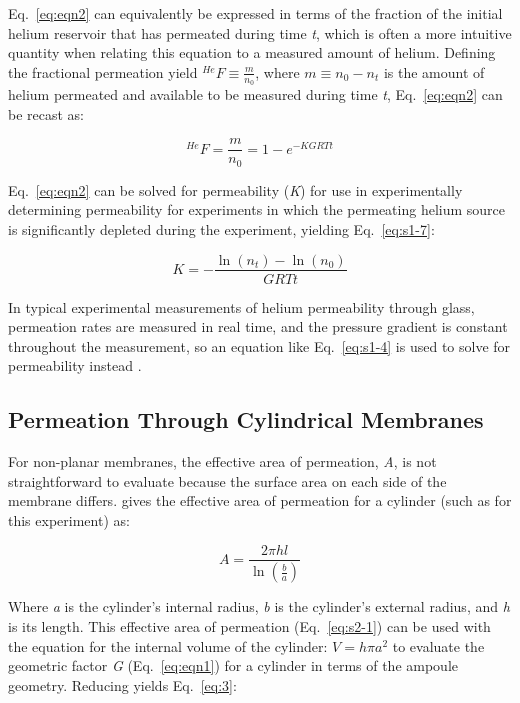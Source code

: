 Eq.~\eqref{eq:eqn2} can equivalently be expressed in terms of the
fraction of the initial helium reservoir that has permeated during time
\emph{t}, which is often a more intuitive quantity when relating this
equation to a measured amount of helium. Defining the fractional
permeation yield \(^{He}F \equiv \frac{m}{n_{0}}\), where
\(m \equiv n_{0} - n_{t}\) is the amount of helium permeated and available to be measured
during time \emph{t}, Eq.~\eqref{eq:eqn2} can be recast as:

\begin{equation}
^{He}F = \frac{m}{n_{0}} = 1 - e^{- KGRTt}
\label{eq:fracyield}
\end{equation}

Eq.~\eqref{eq:eqn2} can be solved for permeability (\emph{K}) for use in
experimentally determining permeability for experiments in which the
permeating helium source is significantly depleted during the
experiment, yielding Eq.~\eqref{eq:s1-7}:

\begin{equation}
K = - \frac{\ln\left( n_{t} \right) - \ln\left( n_{0} \right)}{GRTt}
\label{eq:s1-7}
\end{equation}

In typical experimental measurements of helium permeability through
glass, permeation rates are measured in real time, and the pressure
gradient is constant throughout the measurement, so an equation like
Eq.~\eqref{eq:s1-4} is used to solve for permeability instead \citep{norton1953,swets1961,altemose1961}.

\subsection{Permeation Through Cylindrical Membranes}\label{permeation-through-cylindrical-membranes}

For non-planar membranes, the effective area of permeation, \emph{A}, is
not straightforward to evaluate because the surface area on each side of
the membrane differs. \citet{masaryk1968} gives the effective area of
permeation for a cylinder (such as for this experiment) as:

\begin{equation}
A = \frac{2\pi hl}{\ln\left( \frac{b}{a} \right)}
\label{eq:s2-1}
\end{equation}

Where \emph{a} is the cylinder's internal radius, \emph{b} is the
cylinder's external radius, and \emph{h} is its length. This effective area of
permeation (Eq.~\eqref{eq:s2-1}) can be used with the equation for the internal
volume of the cylinder: \(V = h\pi a^{2}\) to evaluate the geometric
factor \emph{G} (Eq.~\eqref{eq:eqn1}) for a cylinder in terms of the ampoule
geometry. Reducing yields Eq.~\eqref{eq:3}:

